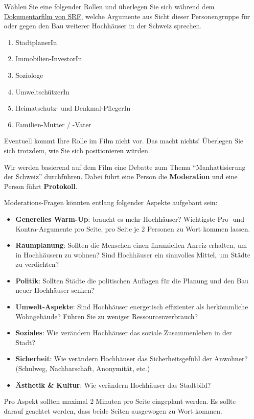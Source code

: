 \begin{myexercise}
Wählen Sie eine folgender Rollen und überlegen Sie sich während dem \href{https://www.srf.ch/play/tv/kulturplatz/video/hochhaeuser-das-leben-in-der-vertikale?urn=urn:srf:video:a98ccb20-f5ad-46ea-8203-2688102543d4}{Dokumentarfilm von SRF}, welche Argumente aus Sicht dieser Personengruppe für oder gegen den Bau weiterer Hochhäuser in der Schweiz sprechen.
\begin{enumerate}
\item StadtplanerIn
\item Immobilien-InvestorIn
\item Soziologe
\item UmweltschützerIn
\item Heimatschutz- und Denkmal-PflegerIn
\item Familien-Mutter / -Vater
\end{enumerate}
Eventuell kommt Ihre Rolle im Film nicht vor. Das macht nichts! Überlegen Sie sich trotzdem, wie Sie sich positionieren würden.

Wir werden basierend auf dem Film eine Debatte zum Thema \enquote{Manhattisierung der Schweiz} durchführen. Dabei führt eine Person die \textbf{Moderation} und eine Person führt \textbf{Protokoll}.

Moderations-Fragen könnten entlang folgender Aspekte aufgebaut sein: 
\begin{itemize}
\item \textbf{Generelles Warm-Up}: braucht es mehr Hochhäuser? Wichtigste Pro- und Kontra-Argumente pro Seite, pro Seite je 2 Personen zu Wort kommen lassen.
\item \textbf{Raumplanung}: Sollten die Menschen einen finanziellen Anreiz erhalten, um in Hochhäusern zu wohnen? Sind Hochhäuser ein sinnvolles Mittel, um Städte zu verdichten?
\item \textbf{Politik}: Sollten Städte die politischen Auflagen für die Planung und den Bau neuer Hochhäuser senken?
\item \textbf{Umwelt-Aspekte}: Sind Hochhäuser energetisch effizienter als herkömmliche Wohngebäude? Führen Sie zu weniger Ressourcenverbrauch?
\item \textbf{Soziales}: Wie verändern Hochhäuser das soziale Zusammenleben in der Stadt?
\item \textbf{Sicherheit}: Wie verändern Hochhäuser das Sicherheitsgefühl der Anwohner? (Schulweg, Nachbarschaft, Anonymität, etc.)
\item \textbf{Ästhetik \& Kultur}: Wie verändern Hochhäuser das Stadtbild?
\end{itemize}

Pro Aspekt sollten maximal 2 Minuten pro Seite eingeplant werden. Es sollte darauf geachtet werden, dass beide Seiten ausgewogen zu Wort kommen.
\end{myexercise}

